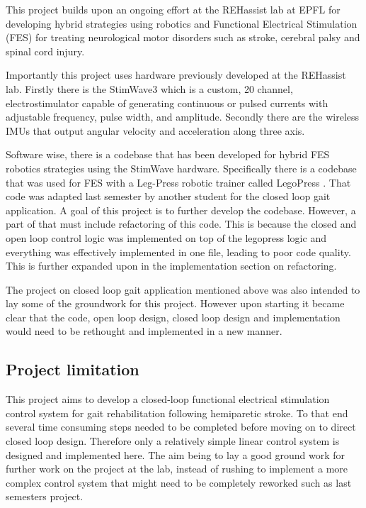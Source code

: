 This project builds upon an ongoing effort at the REHassist lab at EPFL for developing hybrid strategies using robotics and Functional Electrical Stimulation (FES) for treating neurological motor disorders such as stroke, cerebral palsy and spinal cord injury. 

Importantly this project uses hardware previously developed at the REHassist lab. Firstly there is the StimWave3 which is a custom, 20 channel, electrostimulator capable of generating continuous or pulsed currents with adjustable frequency, pulse width, and amplitude. Secondly there are the wireless IMUs that output angular velocity and acceleration along three axis. 

Software wise, there is a codebase that has been developed for hybrid FES robotics strategies using the StimWave hardware. Specifically there is a codebase that was used for FES with a Leg-Press robotic trainer called LegoPress \cite{olivier_legopress_2014}. That code was adapted last semester by another student for the closed loop gait application. A goal of this project is to further develop the codebase. However, a part of that must include refactoring of this code. This is because the closed and open loop control logic was implemented on top of the legopress logic and everything was effectively implemented in one file, leading to poor code quality. This is further expanded upon in the implementation section on refactoring.

The project on closed loop gait application mentioned above was also intended to lay some of the groundwork for this project. However upon starting it became clear that the code, open loop design, closed loop design and implementation would need to be rethought and implemented in a new manner.

\subsection{Project limitation}
This project aims to develop a closed-loop functional electrical stimulation control system for gait rehabilitation following hemiparetic stroke. To that end several time consuming steps needed to be completed before moving on to direct closed loop design. Therefore only a relatively simple linear control system is designed and implemented here. The aim being to lay a good ground work for further work on the project at the lab, instead of rushing to implement a more complex control system that might need to be completely reworked such as last semesters project. 

